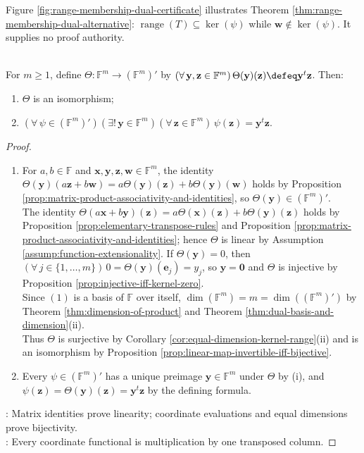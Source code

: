 Figure \ref{fig:range-membership-dual-certificate} illustrates Theorem \ref{thm:range-membership-dual-alternative}: $\operatorname{range}(T)\subseteq\ker(\psi)$ while $\mathbf{w}\notin\ker(\psi)$. It supplies no proof authority.

\begin{proposition} \label{prop:standard-coordinate-dual-identification} \\
For $m\geq1$, define $\Theta:\mathbb{F}^m\to(\mathbb{F}^m)'$ by $(\forall\,\mathbf{y},\mathbf{z}\in\mathbb{F}^m)\,\Theta(\mathbf{y})(\mathbf{z})\defeq\mathbf{y}^t\mathbf{z}$. Then:
\begin{enumerate}[label=(\roman*)]
\setlength{\itemsep}{0pt}
\item $\Theta$ is an isomorphism;
\item $(\forall\,\psi\in(\mathbb{F}^m)')(\exists!\,\mathbf{y}\in\mathbb{F}^m)(\forall\,\mathbf{z}\in\mathbb{F}^m)\,\psi(\mathbf{z})=\mathbf{y}^t\mathbf{z}$.
\end{enumerate}
\begin{proof}
\begin{enumerate}[label=(\roman*)]
\setlength{\itemsep}{0pt}
\item For $a,b\in\mathbb{F}$ and $\mathbf{x},\mathbf{y},\mathbf{z},\mathbf{w}\in\mathbb{F}^m$, the identity $\Theta(\mathbf{y})(a\mathbf{z}+b\mathbf{w})=a\Theta(\mathbf{y})(\mathbf{z})+b\Theta(\mathbf{y})(\mathbf{w})$ holds by Proposition \ref{prop:matrix-product-associativity-and-identities}, so $\Theta(\mathbf{y})\in(\mathbb{F}^m)'$.\\
The identity $\Theta(a\mathbf{x}+b\mathbf{y})(\mathbf{z})=a\Theta(\mathbf{x})(\mathbf{z})+b\Theta(\mathbf{y})(\mathbf{z})$ holds by Proposition \ref{prop:elementary-transpose-rules} and Proposition \ref{prop:matrix-product-associativity-and-identities}; hence $\Theta$ is linear by Assumption \ref{assump:function-extensionality}. If $\Theta(\mathbf{y})=0$, then $(\forall\,j\in\{1,\ldots,m\})\,0=\Theta(\mathbf{y})(\mathbf{e}_j)=y_j$, so $\mathbf{y}=\mathbf{0}$ and $\Theta$ is injective by Proposition \ref{prop:injective-iff-kernel-zero}.\\
Since $(1)$ is a basis of $\mathbb{F}$ over itself, $\dim(\mathbb{F}^m)=m=\dim((\mathbb{F}^m)')$ by Theorem \ref{thm:dimension-of-product} and Theorem \ref{thm:dual-basis-and-dimension}(ii).\\
Thus $\Theta$ is surjective by Corollary \ref{cor:equal-dimension-kernel-range}(ii) and is an isomorphism by Proposition \ref{prop:linear-map-invertible-iff-bijective}.
\item Every $\psi\in(\mathbb{F}^m)'$ has a unique preimage $\mathbf{y}\in\mathbb{F}^m$ under $\Theta$ by (i), and $\psi(\mathbf{z})=\Theta(\mathbf{y})(\mathbf{z})=\mathbf{y}^t\mathbf{z}$ by the defining formula.
\end{enumerate}
: Matrix identities prove linearity; coordinate evaluations and equal dimensions prove bijectivity.\\
: Every coordinate functional is multiplication by one transposed column.
\end{proof}
\end{proposition}

